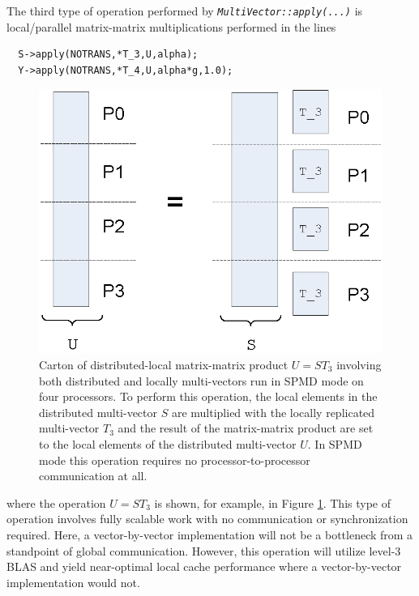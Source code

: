 \documentclass[pdf,ps2pdf,11pt]{SANDreport}
\begin{document}
The third type of operation performed by
{}\texttt{\textit{Multi\-Vector\-::apply(\-...)}} is local/parallel
matrix-matrix multiplications performed in the lines

{\scriptsize\begin{verbatim}
  S->apply(NOTRANS,*T_3,U,alpha);
  Y->apply(NOTRANS,*T_4,U,alpha*g,1.0);
\end{verbatim}}

{\bsinglespace
\begin{figure}
\begin{center}
\includegraphics*[angle=0,scale=0.60]{SPMD_Dist_Local_Matrix_Matrix_Prod_P4}
\end{center}
\caption{
\label{tsfcore:fig:SPMD_Dist_Local_Matrix_Matrix_Prod_P4}
Carton of distributed-local matrix-matrix product $U = S T_3$
involving both distributed and locally multi-vectors run in SPMD mode
on four processors.  To perform this operation, the local elements in
the distributed multi-vector $S$ are multiplied with the locally
replicated multi-vector $T_3$ and the result of the matrix-matrix
product are set to the local elements of the distributed multi-vector
$U$.  In SPMD mode this operation requires no processor-to-processor
communication at all.}
\end{figure}
\esinglespace}

{}\noindent{}where the operation $U = S T_3$ is shown, for
example, in Figure
{}\ref{tsfcore:fig:SPMD_Dist_Local_Matrix_Matrix_Prod_P4}.  This type of
operation involves fully scalable work with no communication or
synchronization required.  Here, a vector-by-vector implementation
will not be a bottleneck from a standpoint of global communication.
However, this operation will utilize level-3 BLAS and yield
near-optimal local cache performance where a vector-by-vector
implementation would not.
\end{document}
